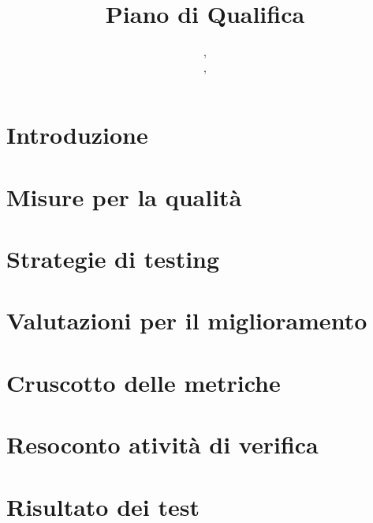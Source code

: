 \documentclass{classes/base}
\title{Piano di Qualifica}
\author{\marcob, \\ \ruth, \\ \matteo}
\begin{document}
	\maketitle
	\newpage
	
	\newpage
	\tableofcontents
	\newpage
	\listoftables
	\newpage
	\listoffigures
	
	\newpage
	\section{Introduzione}
	
	
    \newpage
	\section{Misure per la qualità}
	
	
	\newpage
	\section{Strategie di testing}
	
	
	\newpage
	\section{Valutazioni per il miglioramento}
	
	
	\newpage
	\section{Cruscotto delle metriche}
	

	\newpage
	\section{Resoconto atività di verifica}
	

	\newpage
	\section{Risultato dei test}
	
\end{document}
